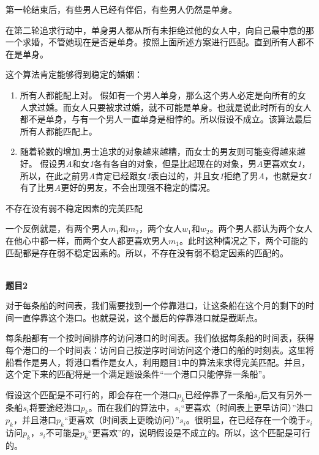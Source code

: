 \documentclass[a4paper,11pt,UTF8]{ctexart}
\begin{document}
\begin{spacing}{1.2}
第一轮结束后，有些男人已经有伴侣，有些男人仍然是单身。

在第二轮追求行动中，单身男人都从所有未拒绝过他的女人中，向自己最中意的那一个求婚，不管她现在是否是单身。按照上面所述方案进行匹配。直到所有人都不在是单身。

这个算法肯定能够得到稳定的婚姻：

\begin{enumerate}[itemindent=3em]
  \item 所有人都能配上对。  假如有一个男人单身，那么这个男人必定是向所有的女人求过婚。而女人只要被求过婚，就不可能是单身。也就是说此时所有的女人都不是单身，与有一个男人一直单身是相悖的。所以假设不成立。该算法最后所有人都能匹配上。

  \item 随着轮数的增加,男士追求的对象越来越糟，而女士的男友则可能变得越来越好。  假设男\textit{A}和女\textit{1}各有各自的对象，但是比起现在的对象，男\textit{A}更喜欢女\textit{1}，所以，在此之前男\textit{A}肯定已经跟女\textit{1}表白过的，并且女\textit{1}拒绝了男\textit{A}，也就是女\textit{1}有了比男\textit{A}更好的男友，不会出现强不稳定的情况。
\end{enumerate}


不存在没有弱不稳定因素的完美匹配

一个反例就是，有两个男人$m_1$和$m_2$，两个女人$w_1$和$w_2$。两个男人都认为两个女人在他心中都一样，而两个女人都更喜欢男人$m_1$。此时这种情况之下，两个可能的匹配都是存在弱不稳定因素的。所以，不存在没有弱不稳定因素的匹配的。





~\\

\setlength{\parindent}{0em}
\textbf{\large{题目2}}
\setlength{\parindent}{2em}

对于每条船的时间表，我们需要找到一个停靠港口，让这条船在这个月的剩下的时间一直停靠这个港口。也就是说，这个最后的停靠港口就是截断点。

每条船都有一个按时间排序的访问港口的时间表。我们依据每条船的时间表，获得每个港口的一个时间表：访问自己按逆序时间访问这个港口的船的时刻表。这里将船看作是男人，将港口看作是女人，利用题目1中的算法来求得完美匹配。并且，这个定下来的匹配将是一个满足题设条件“一个港口只能停靠一条船”。

假设这个匹配是不可行的，即会存在一个港口$p_k$已经停靠了一条船$s_j$后又有另外一条船$s_i$将要途经港口$p_k$。而在我们的算法中，$s_i$“更喜欢（时间表上更早访问）”港口$p_k$，并且港口$p_k$“更喜欢（时间表上更晚访问）”$s_i$。很明显，在已经存在一个晚于$s_i$访问$p_k$，$s_i$不可能是$p_k$“更喜欢”的，说明假设是不成立的。所以，这个匹配是可行的。




\end{spacing}
\end{document}
